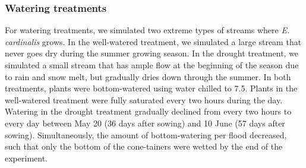 \documentclass[11pt, oneside]{article}
\begin{document}
\subsubsection*{Watering treatments}

For watering treatments, we simulated two extreme types of streams where \textit{E. cardinalis} grows. In the well-watered treatment, we simulated a large stream that never goes dry during the summer growing season. In the drought treatment, we simulated a small stream that has ample flow at the beginning of the season due to rain and snow melt, but gradually dries down through the summer. In both treatments, plants were bottom-watered using  water chilled to 7.5\celsius. Plants in the well-watered treatment were fully saturated every two hours during the day. Watering in the drought treatment gradually declined from every two hours to every day between May 20 (36 days after sowing) and 10 June (57 days after sowing). Simultaneously, the amount of bottom-watering per flood decreased, such that only the bottom of the cone-tainers were wetted by the end of the experiment.
\end{document}
